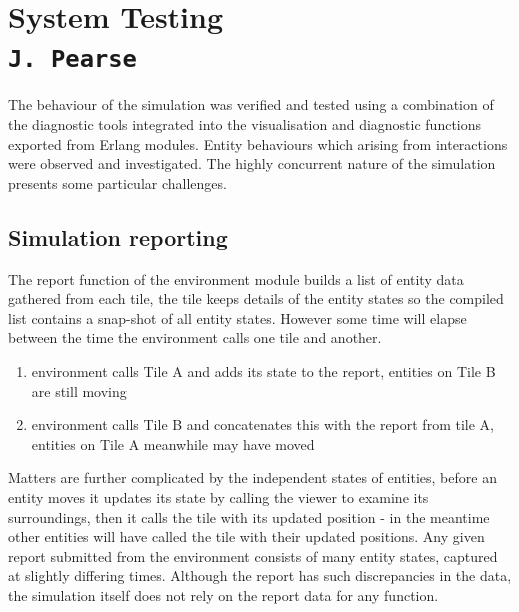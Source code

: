 \pagestyle{empty}
\section{System Testing \\{\small\tt{J.~Pearse}}}
The behaviour of the simulation was verified and tested using a combination of the diagnostic tools integrated into the visualisation and diagnostic functions exported from Erlang modules. Entity behaviours which arising from interactions were observed and investigated. The highly concurrent nature of the simulation presents some particular challenges.

\subsection{Simulation reporting}
The report function of the environment module builds a list of entity data gathered from each tile, the tile keeps details of the entity states so the compiled list contains a snap-shot of all entity states. However some time will elapse between the time the environment calls one tile and another.
\begin{enumerate}
\item{environment calls Tile A and adds its state to the report, entities on Tile B are still moving}
\item{environment calls Tile B and concatenates this with the report from tile A, entities on Tile A meanwhile may have moved}
\end{enumerate}
Matters are further complicated by the independent states of entities, before an entity moves it updates its state by calling the viewer to examine its surroundings, then it calls the tile with its updated position - in the meantime other entities will have called the tile with their updated positions.
Any given report submitted from the environment consists of many entity states, captured at slightly differing times. Although the report has such discrepancies in the data, the simulation itself does not rely on the report data for any function.
